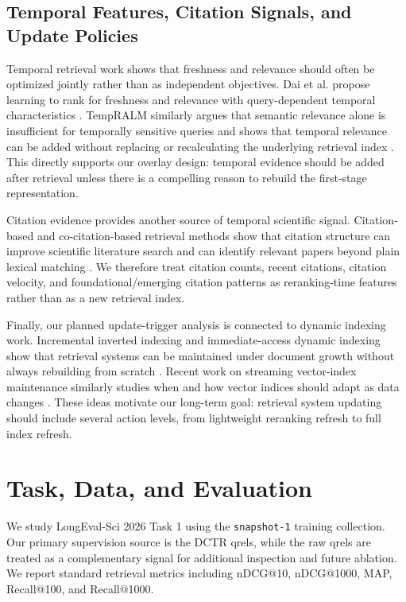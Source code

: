 \documentclass[11pt]{article}
\begin{document}
\subsection{Temporal Features, Citation Signals, and Update Policies}

Temporal retrieval work shows that freshness and relevance should often be optimized jointly rather than as independent objectives. Dai et al. propose learning to rank for freshness and relevance with query-dependent temporal characteristics \cite{dai_learning_2011}. TempRALM similarly argues that semantic relevance alone is insufficient for temporally sensitive queries and shows that temporal relevance can be added without replacing or recalculating the underlying retrieval index \cite{gade_its_2024}. This directly supports our overlay design: temporal evidence should be added after retrieval unless there is a compelling reason to rebuild the first-stage representation.

Citation evidence provides another source of temporal scientific signal. Citation-based and co-citation-based retrieval methods show that citation structure can improve scientific literature search and can identify relevant papers beyond plain lexical matching \cite{janssens2015cocites,janssens2020validation,belter2017ranking,bascur2023citationclusters}. We therefore treat citation counts, recent citations, citation velocity, and foundational/emerging citation patterns as reranking-time features rather than as a new retrieval index.

Finally, our planned update-trigger analysis is connected to dynamic indexing work. Incremental inverted indexing and immediate-access dynamic indexing show that retrieval systems can be maintained under document growth without always rebuilding from scratch \cite{brown_fast_nodate,asadi_fast_2013,moffat_efficient_2023}. Recent work on streaming vector-index maintenance similarly studies when and how vector indices should adapt as data changes \cite{mohoney_incremental_2024}. These ideas motivate our long-term goal: retrieval system updating should include several action levels, from lightweight reranking refresh to full index refresh.

\section{Task, Data, and Evaluation}

We study LongEval-Sci 2026 Task 1 using the \texttt{snapshot-1} training collection. Our primary supervision source is the DCTR qrels, while the raw qrels are treated as a complementary signal for additional inspection and future ablation. We report standard retrieval metrics including nDCG@10, nDCG@1000, MAP, Recall@100, and Recall@1000.
\end{document}
